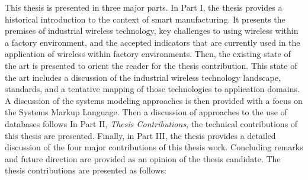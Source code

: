 \documentclass[12pt]{article}
\begin{document}
		This thesis is presented in three major parts.  In Part I, the thesis provides a historical introduction to the context of smart manufacturing.  It presents the premises of industrial wireless technology, key challenges to using wireless within a factory environment, and the accepted indicators that are currently used in the application of wireless within factory environments. Then, the existing state of the art is presented to orient the reader for the thesis contribution.  This state of the art includes a discussion of the industrial wireless technology landscape, standards, and a tentative mapping of those technologies to application domains.  A discussion of the systems modeling approaches is then provided with a focus on the Systems Markup Language.  Then a discussion of approaches to the use of databases follows   In Part II, \textit{Thesis Contributions}, the technical contributions of this thesis are presented.  Finally, in Part III, the thesis provides a detailed discussion of the four major contributions of this thesis work.  Concluding remarks and future direction are provided as an opinion of the thesis candidate.  The thesis contributions are presented as follows:\vspace{5mm}
		
\end{document}
